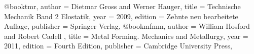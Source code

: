 @book{tmr,
author = {Dietmar Gross and Werner Hauger},
title = {Technische Mechanik Band 2 Elostatik},
year = {2009},
edition = {Zehnte neu bearbeitete Auflage},
publisher = {Springer Verlag},
}
@book{mfmm,
author = {William Hosford and Robert Cadell },
title = {Metal Forming. Mechanics and Metallurgy},
year = {2011},
edition = {Fourth Edition},
publisher = {Cambridge University Press},
}




















